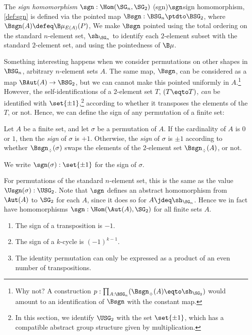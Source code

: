 \begin{definition}\label{def:sgn}
  The \emph{sign homomorphism} $\sgn : \Hom(\SG_n,\SG_2)$%
  \glossary(sgn){$\protect\sgn$}{sign homomorphism, \cref{def:sgn}}
  is defined via the pointed map $\Bsgn : \BSG_n \ptdto \BSG_2$,
  where $\Bsgn(A) \defeq \B\mu_{E(A)}(P)$,
  We make $\Bsgn$ pointed using the total ordering on the standard $n$-element set,
  $\sh_{\SG_n}$ to identify each $2$-element subset with the standard $2$-element set,
  and using the pointedness of $\B\mu$.
\end{definition}
Something interesting happens when we consider permutations on other shapes in $\BSG_n$,
\ie arbitrary $n$-element sets $A$.
The same map, $\Bsgn$, can be considered as a map $\BAut(A) \to \BSG_2$,
but we can cannot make this pointed uniformly in $A$.\footnote{%
  Why not? A construction $p : \prod_{A:\BSG_n}(\Bsgn_\div(A) \eqto \sh_{\SG_2})$
  would amount to an identification of $\Bsgn$ with the constant map.}
However, the self-identifications of a $2$-element set $T$, $(T \eqto T)$,
\emph{can} be identified with $\set{\pm1}$,\footnote{%
  In this section, we identify $\USG_2$ with the set $\set{\pm1}$,
  which has a compatible abstract group structure given by multiplication.}
according to whether it transposes the elements of the $T$, or not.
Hence, we can define the sign of any permutation of a finite set:
\begin{definition}\label{def:sgn-permutation}
  Let $A$ be a finite set, and let $\sigma$ be a permutation of $A$.
  If the cardinality of $A$ is $0$ or $1$,
  then the \emph{sign} of $\sigma$ is $+1$.
  Otherwise, the \emph{sign} of $\sigma$ is $\pm1$ according to whether
  $\Bsgn_\div(\sigma)$ swaps the elements of the $2$-element set $\Bsgn_\div(A)$, or not.

  We write $\sgn(\sigma):\set{\pm1}$ for the sign of $\sigma$.
\end{definition}
For permutations of the standard $n$-element set,
this is the same as the value $\Usgn(\sigma) : \USG_2$.
Note that $\sgn$ defines an abstract homomorphism from $\Aut(A)$ to $\SG_2$
for each $A$, since it does so for $A \jdeq \sh_{\SG_n}$.
Hence we in fact have homomorphisms $\sgn : \Hom(\Aut(A),\SG_2)$ for all finite sets $A$.

\begin{lemma}\label{lem:sign-properties}
  \begin{enumerate}
  \item\label{it:sign-transposition}
    The sign of a transposition is $-1$.
  \item\label{it:sign-cycle}
    The sign of a $k$-cycle is $(-1)^{k-1}$.
  \item\label{it:identity-even}
    The identity permutation can only be expressed as a product
    of an even number of transpositions.
  \end{enumerate}
\end{lemma}

